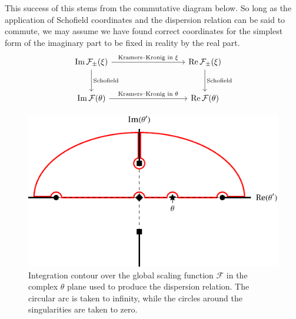 \documentclass[
  aps,
  pre,
  reprint,
  longbibliography,
  floatfix
]{revtex4-2}
\begin{document}
This success of this stems from the commutative diagram below. So long as the
application of Schofield coordinates and the dispersion relation can be said to
commute, we may assume we have found correct coordinates for the simplest form
of the imaginary part to be fixed in reality by the real part.
\[
  \begin{tikzcd}[row sep=large, column sep = 9em]
  \operatorname{Im}\mathcal F_\pm(\xi) \arrow{r}{\text{Kramers--Kronig in $\xi$}} \arrow[]{d}{\text{Schofield}} & \operatorname{Re}\mathcal F_{\pm}(\xi) \arrow{d}{\text{Schofield}} \\%
  \operatorname{Im}\mathcal F(\theta) \arrow{r}{\text{Kramers--Kronig in $\theta$}}& \operatorname{Re}\mathcal F(\theta)
\end{tikzcd}
\]

\begin{figure}
  \includegraphics{figs/contour_path.pdf}
  \caption{
    Integration contour over the global scaling function $\mathcal F$ in the
    complex $\theta$ plane used to produce the dispersion relation. The
    circular arc is taken to infinity, while the circles around the
    singularities are taken to zero.
  } \label{fig:contour}
\end{figure}
\end{document}
